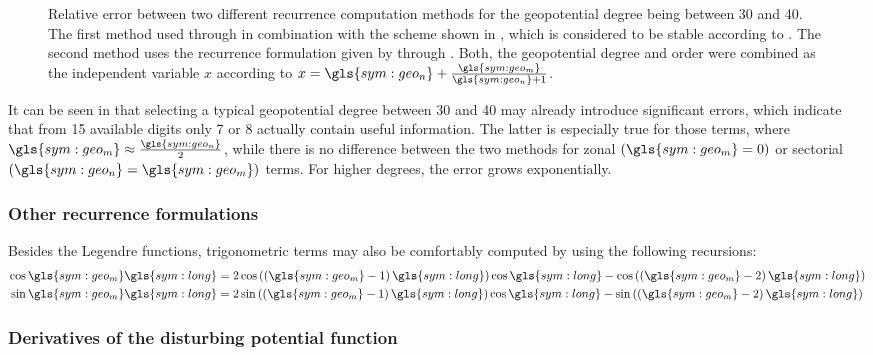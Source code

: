 \begin{figure}[h!]
 \centering
 
 \caption{Relative error between two different recurrence computation methods for the geopotential degree being between \num{30} and \num{40}. The first method
used  through  in combination with the scheme shown in , which is considered to be stable
according to \citet{montenbruck2000, brumberg1995, lundberg1985}. The second method uses the recurrence formulation given by  through
. Both, the geopotential degree and order were combined as the independent variable $x$ according to
$x=\gls{sym:geo_n}+\frac{\gls{sym:geo_m}}{\gls{sym:geo_n}+1}$.\label{fig:legendre-unstable-example}}
\end{figure}

It can be seen in  that selecting a typical geopotential degree between \num{30} and \num{40} may already introduce significant errors, which
indicate that from \num{15} available digits only \num{7} or \num{8} actually contain useful information. The latter is especially true for those terms, where
$\gls{sym:geo_m}\approx \frac{\gls{sym:geo_n}}{2}$, while there is no difference between the two methods for zonal $\left(\gls{sym:geo_m}=0\right)$ or sectorial
$\left(\gls{sym:geo_n}=\gls{sym:geo_m}\right)$ terms. For higher degrees, the error grows exponentially.

\subsubsection{Other recurrence formulations}

Besides the Legendre functions, trigonometric terms may also be comfortably computed by using the following recursions:
\begin{align}
 \cos\gls{sym:geo_m} \gls{sym:long} &=
2\cos \left(\left(\gls{sym:geo_m}-1\right)\gls{sym:long}\right)\cos \gls{sym:long} - \cos\left(\left(\gls{sym:geo_m}-2\right)\gls{sym:long}\right) \\
\sin \gls{sym:geo_m} \gls{sym:long} &=
2\sin \left(\left(\gls{sym:geo_m}-1\right)\gls{sym:long}\right)\cos \gls{sym:long} - \sin\left(\left(\gls{sym:geo_m}-2\right)\gls{sym:long}\right)
\end{align}


\subsubsection{Derivatives of the disturbing potential function}

